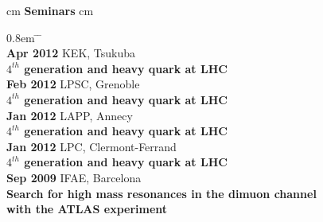 \documentclass[12pt]{article}
\begin{document}
 cm
{\bf  \large  Seminars}
 cm
\begin{tabbing}
\itemsep0.8em
   \= \hskip  3.3cm  \=  \hskip 7.3cm \=   \\ 
 
  \> {\bf Apr 2012} \> KEK, Tsukuba \>  \\
  \> \>  {\bf $4^{th}$ generation and heavy quark at LHC}\>  \\[0.2cm]

  \> {\bf Feb 2012} \> LPSC, Grenoble\>  \\
  \> \>  {\bf $4^{th}$ generation and heavy quark at LHC}\>  \\[0.2cm]

  \> {\bf Jan 2012} \> LAPP, Annecy\>  \\
  \> \>  {\bf $4^{th}$ generation and heavy quark at LHC}\>  \\[0.2cm]

  \> {\bf Jan 2012} \> LPC, Clermont-Ferrand\>  \\
  \> \>  {\bf $4^{th}$ generation and heavy quark at LHC}\>  \\[0.2cm]

  \> {\bf Sep 2009} \> IFAE, Barcelona\>  \\
  \> \>  {\bf Search for high mass resonances in the dimuon channel}\>  \\
  \> \>  {\bf with the ATLAS experiment}\>  \\[0.2cm]

\end{tabbing}






\end{document}
